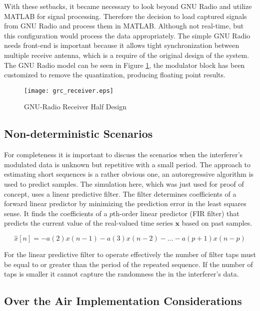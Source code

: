 With these setbacks, it became necessary to look beyond GNU Radio and utilize MATLAB for signal processing.  Therefore the decision to load captured signals from GNU Radio and process them in MATLAB.  Although not real-time, but this configuration would process the data appropriately.  The simple GNU Radio needs front-end is important because it allows tight synchronization between multiple receive antenna, which is a require of the original design of the system.  The GNU Radio model can be seen in Figure \ref{ref:grc_receiver}, the modulator block has been customized to remove the quantization, producing floating point results.\\

\begin{figure}[!ht]\label{ref:grc_receiver}
\centering
\texttt{[image: grc\_receiver.eps]}
\caption{GNU-Radio Receiver Half Design}
\end{figure}

\subsection{Non-deterministic Scenarios}

For completeness it is important to discuss the scenarios when the interferer's modulated data is unknown but repetitive with a small period.  The approach to estimating short sequences is a rather obvious one, an autoregressive algorithm is used to predict samples.  The simulation here, which was just used for proof of concept, uses a linear predictive filter.  The filter determines coefficients of a forward linear predictor by minimizing the prediction error in the least squares sense\cite{lpcfilter}.  It finds the coefficients of a \(p\)th-order linear predictor (FIR filter) that predicts the current value of the real-valued time series \(\textbf{x}\) based on past samples.

\[ \hat{x}[n]=-a(2)x(n-1)-a(3)x(n-2)-...-a(p+1)x(n-p)\]

For the linear predictive filter to operate effectively the number of filter taps must be equal to or greater than the period of the repeated sequence.  If the number of taps is smaller it cannot capture the randomness the in the interferer's data.\\

\subsection{Over the Air Implementation Considerations}

